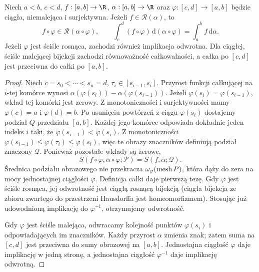 \begin{twierdzenie}\label{it:thm:rs-reparametrization}
Niech $a<b$, $c<d$, $f:[a,b]\to\R$, $\alpha:[a,b]\to\R$ oraz
$\varphi:[c,d]\to[a,b]$ będzie ciągła, niemalejąca i surjektywna.
Jeżeli $f\in\mathcal R(\alpha)$, to
\[
 f\circ\varphi\in\mathcal R(\alpha\circ\varphi),\qquad
 \int_c^d(f\circ\varphi)\,\mathrm d(\alpha\circ\varphi)
 =\int_a^b f\,\mathrm d\alpha.
\]
Jeżeli $\varphi$ jest ściśle rosnąca, zachodzi również implikacja odwrotna.
Dla ciągłej, ściśle malejącej bijekcji zachodzi równoważność
całkowalności, a całka po $[c,d]$ jest przeciwna do całki po $[a,b]$.
\end{twierdzenie}
\begin{proof}
Niech $c=s_0<\cdots<s_n=d$, $\tau_i\in[s_{i-1},s_i]$.
Przyrost funkcji całkującej na $i$-tej komórce wynosi
$\alpha(\varphi(s_i))-\alpha(\varphi(s_{i-1}))$.
Jeżeli $\varphi(s_i)=\varphi(s_{i-1})$, wkład tej komórki jest zerowy.
Z monotoniczności i surjektywności mamy
$\varphi(c)=a$ i $\varphi(d)=b$. Po usunięciu powtórzeń
z ciągu $\varphi(s_i)$ dostajemy podział $Q$ przedziału
$[a,b]$. Każdej jego komórce odpowiada dokładnie jeden
indeks $i$ taki, że $\varphi(s_{i-1})<\varphi(s_i)$.
Z monotoniczności
$\varphi(s_{i-1})\le\varphi(\tau_i)\le\varphi(s_i)$,
więc te obrazy znaczników definiują podział znaczony
$\mathcal Q$. Ponieważ pozostałe wkłady są zerowe,
\[
 S(f\circ\varphi,\alpha\circ\varphi;\mathcal P)
 =S(f,\alpha;\mathcal Q).
\] Średnica podziału obrazowego nie
przekracza $\omega_\varphi(\operatorname{mesh} P)$, która dąży do zera na mocy
jednostajnej ciągłości $\varphi$. Definicja całki daje pierwszą tezę.
Gdy $\varphi$ jest ściśle rosnąca, jej odwrotność jest ciągłą rosnącą
bijekcją (ciągła bijekcja ze zbioru zwartego do przestrzeni Hausdorffa
jest homeomorfizmem). Stosując już udowodnioną implikację do
$\varphi^{-1}$, otrzymujemy odwrotność.

Gdy $\varphi$ jest ściśle malejąca, odwracamy kolejność punktów
$\varphi(s_i)$ i odpowiadających im znaczników. Każdy przyrost
$\alpha$ zmienia znak; zatem suma na $[c,d]$ jest przeciwna do
sumy obrazowej na $[a,b]$. Jednostajna ciągłość $\varphi$ daje
implikację w jedną stronę, a jednostajna ciągłość $\varphi^{-1}$
daje implikację odwrotną.
\end{proof}

